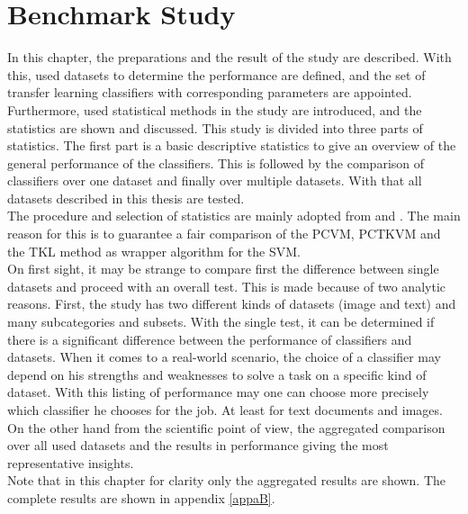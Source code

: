 \chapter{Benchmark Study}\label{EmChap}
In this chapter, the preparations and the result of the study are described.
With this, used datasets to determine the performance are defined, and the set of transfer learning classifiers with  corresponding parameters are appointed.\\
Furthermore, used statistical methods in the study are introduced, and the statistics are shown and discussed.
This study is divided into three parts of statistics.
The first part is a basic descriptive statistics to give an overview of the general performance of the classifiers.
This is followed by the comparison of classifiers over one dataset and finally over multiple datasets.
With that all datasets described in this thesis are tested.\\
The procedure and selection of statistics are mainly adopted from \cite{Chen.2009} and \cite{Long.2015}.
The main reason for this is to guarantee a fair comparison of the \acs{PCVM}, \acs{PCTKVM} and the \acs{TKL} method as wrapper algorithm for the \acs{SVM}.\\
On first sight, it may be strange to compare first the difference between single datasets and proceed with an overall test.
This is made because of two analytic reasons. First, the study has two different kinds of datasets (image and text) and many subcategories and subsets.
With the single test, it can be determined if there is a significant difference between the performance of classifiers and datasets.
When it comes to a real-world scenario, the choice of a classifier may depend on his strengths and weaknesses to solve a task on a specific kind of dataset.
With this listing of performance may one can choose more precisely which classifier he chooses for the job. At least for text documents and images.\\
On the other hand from the scientific point of view, the aggregated comparison over all used datasets and the results in performance giving the most representative insights.\\
Note that in this chapter for clarity only the aggregated results are shown. The complete results are shown in appendix \ref{appaB}.


